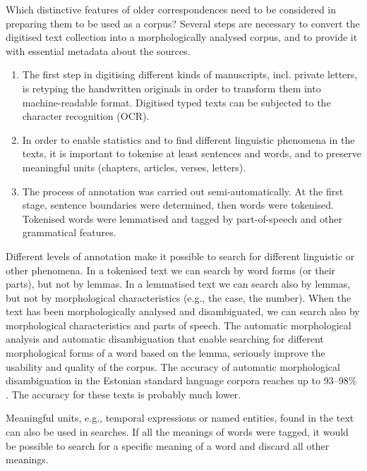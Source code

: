 \documentclass[runningheads]{llncs}
\begin{document}
Which distinctive features of older correspondences need to be considered in preparing them to be used as a corpus? Several steps are necessary to convert the digitised text collection into a morphologically analysed corpus, and to provide it with essential metadata about the sources.

\begin{enumerate}
\item The first step in digitising different kinds of manuscripts, incl. private letters, is retyping the handwritten originals in order to transform them into machine-readable format. Digitised typed texts can be subjected to the character recognition (OCR). 

\item In order to enable statistics and to find different linguistic phenomena in the texts, it is important to tokenise at least sentences and words, and to preserve meaningful units (chapters, articles, verses, letters). 

  \item The process of annotation was carried out semi-automatically. At the first stage, sentence boundaries were determined, then words were tokenised. Tokenised words were lemmatised and tagged by part-of-speech and other grammatical features.

\end{enumerate}

Different levels of annotation make it possible to search for different linguistic or other phenomena. In a tokenised text we can search by word forms (or their parts), but not by lemmas. In a lemmatised text we can search also by lemmas, but not by morphological characteristics (e.g., the case, the number). When the text has been morphologically analysed and disambiguated, we can search also by morphological characteristics and parts of speech. The automatic morphological analysis and automatic disambiguation that enable searching for different morphological forms of a word based on the lemma, seriously improve the usability and quality of the corpus. The accuracy of automatic morphological disambiguation in the Estonian standard language corpora reaches up to 93--98\% \cite{veskisliba}.  The accuracy for these texts is probably much lower.


Meaningful units, e.g., temporal expressions or named entities, found in the text can also be used in searches. If all the meanings of words were tagged, it would be possible to search for a specific meaning of a word and discard all other meanings. 
\end{document}
